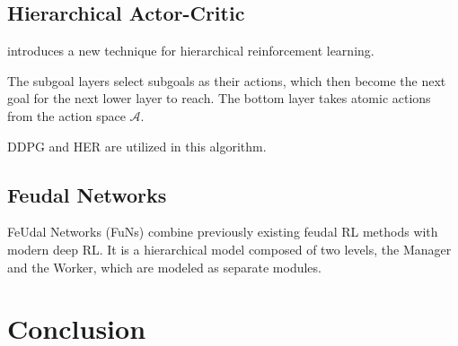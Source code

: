 \documentclass[runningheads]{llncs}
\begin{document}
\subsection{Hierarchical Actor-Critic}

\cite{levy2017hierarchical} introduces a new technique for hierarchical reinforcement learning.

The subgoal layers select subgoals as their actions, which then become the next goal for the next lower layer to reach. The bottom layer takes atomic actions from the action space $\mathcal{A}$.

DDPG and HER are utilized in this algorithm.

\subsection{Feudal Networks}

FeUdal Networks (FuNs) \cite{vezhnevets2017feudal} combine previously existing feudal RL methods \cite{dayan1993feudal} with modern deep RL. It is a hierarchical model composed of two levels, the Manager and the Worker, which are modeled as separate modules.

\section{Conclusion}

%
%
%
% 
% 
%



\end{document}
